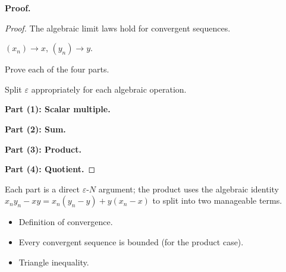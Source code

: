 \noindent
\textbf{Proof.}
\begin{proof}
\Claim The algebraic limit laws hold for convergent sequences.

\Given $(x_n) \to x$, $(y_n) \to y$.

\Goal Prove each of the four parts.

\Strategy Split $\varepsilon$ appropriately for each algebraic operation.

\medskip

\textbf{Part (1): Scalar multiple.}

\medskip

\textbf{Part (2): Sum.}

\medskip

\textbf{Part (3): Product.}

\medskip

\textbf{Part (4): Quotient.}

\end{proof}

\begin{remark*}
Each part is a direct $\varepsilon$-$N$ argument; the product uses the
algebraic identity $x_n y_n - xy = x_n(y_n - y) + y(x_n - x)$ to split
into two manageable terms.
\end{remark*}

\begin{remark*}[Dependencies]
\begin{itemize}
  \item Definition of convergence.
  \item Every convergent sequence is bounded (for the product case).
  \item Triangle inequality.
\end{itemize}
\end{remark*}
